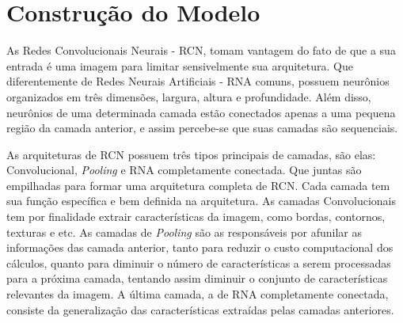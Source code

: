 
\section{Construção do Modelo}

As Redes Convolucionais Neurais - RCN, tomam vantagem do fato de que a sua entrada é uma imagem para limitar sensivelmente sua arquitetura. Que diferentemente de Redes Neurais Artificiais - RNA comuns, possuem neurônios organizados em três dimensões, largura, altura e profundidade. Além disso, neurônios de uma determinada camada estão conectados apenas a uma pequena região da camada anterior, e assim percebe-se que suas camadas são sequenciais.

As arquiteturas de RCN possuem três tipos principais de camadas, são elas: Convolucional, \textit{Pooling} e RNA completamente conectada. Que juntas são empilhadas para formar uma arquitetura completa de RCN. Cada camada tem sua função específica e bem definida na arquitetura. As camadas Convolucionais tem por finalidade extrair características da imagem, como bordas, contornos, texturas e etc. As camadas de \textit{Pooling} são as responsáveis por afunilar as informações das camada anterior, tanto para reduzir o custo computacional dos cálculos, quanto para diminuir o número de características a serem processadas para a próxima camada, tentando assim diminuir o conjunto de características relevantes da imagem. A última camada, a de RNA completamente conectada, consiste da generalização das características extraídas pelas camadas anteriores.



